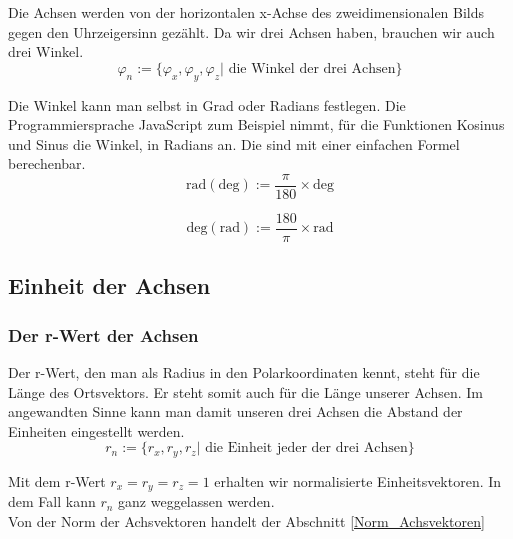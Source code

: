 \documentclass[a4paper]{article}
\begin{document}
Die Achsen werden von der horizontalen x-Achse des zweidimensionalen Bilds gegen den Uhrzeigersinn gez\"ahlt. Da wir drei Achsen haben, brauchen wir auch drei Winkel.\\

\begin{displaymath}
	\varphi_n := \{ \varphi_x, \varphi_y, \varphi_z | \mbox{ die Winkel der drei Achsen}\}
\end{displaymath}

Die Winkel kann man selbst in Grad oder Radians festlegen. Die Programmiersprache JavaScript zum Beispiel nimmt, f\"ur die Funktionen Kosinus und Sinus die Winkel, in Radians an. Die sind mit einer einfachen Formel berechenbar.\\

\begin{displaymath}
	\mbox{rad}(\mbox{deg}) := \frac{\pi}{180} \times \mbox{deg}
\end{displaymath}

\begin{displaymath}
	\mbox{deg}(\mbox{rad}) := \frac{180}{\pi} \times \mbox{rad}
\end{displaymath}

\subsection{Einheit der Achsen}

\subsubsection{Der r-Wert der Achsen}

Der r-Wert, den man als Radius in den Polarkoordinaten kennt, steht f\"ur die L\"ange des Ortsvektors. Er steht somit auch f\"ur die L\"ange unserer Achsen. Im angewandten Sinne kann man damit unseren drei Achsen die Abstand der Einheiten eingestellt werden.\\


\begin{displaymath}
	r_n := \{ r_x , r_y , r_z | \mbox{ die Einheit jeder der drei Achsen}\}
\end{displaymath}

Mit dem r-Wert $r_x = r_y = r_z = 1$ erhalten wir normalisierte Einheitsvektoren. In dem Fall kann $r_n$ ganz weggelassen werden.\\

Von der Norm der Achsvektoren handelt der Abschnitt \ref{Norm_Achsvektoren}
\end{document}
